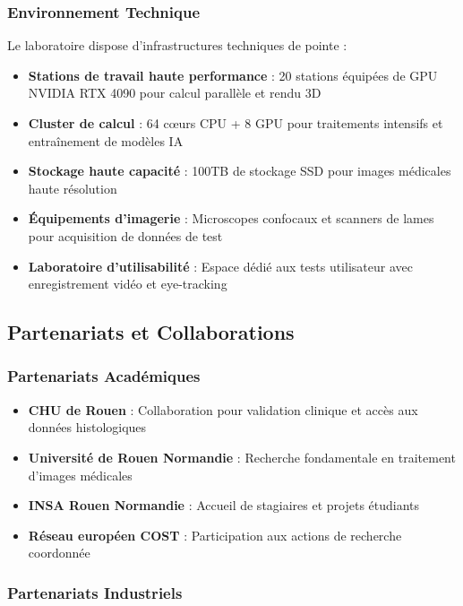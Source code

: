 \documentclass[12pt,a4paper]{report}
\begin{document}
\subsubsection{Environnement Technique}

Le laboratoire dispose d'infrastructures techniques de pointe :

\begin{itemize}
\item \textbf{Stations de travail haute performance} : 20 stations équipées de GPU NVIDIA RTX 4090 pour calcul parallèle et rendu 3D
\item \textbf{Cluster de calcul} : 64 cœurs CPU + 8 GPU pour traitements intensifs et entraînement de modèles IA
\item \textbf{Stockage haute capacité} : 100TB de stockage SSD pour images médicales haute résolution
\item \textbf{Équipements d'imagerie} : Microscopes confocaux et scanners de lames pour acquisition de données de test
\item \textbf{Laboratoire d'utilisabilité} : Espace dédié aux tests utilisateur avec enregistrement vidéo et eye-tracking
\end{itemize}

\subsection{Partenariats et Collaborations}

\subsubsection{Partenariats Académiques}

\begin{itemize}
\item \textbf{CHU de Rouen} : Collaboration pour validation clinique et accès aux données histologiques
\item \textbf{Université de Rouen Normandie} : Recherche fondamentale en traitement d'images médicales
\item \textbf{INSA Rouen Normandie} : Accueil de stagiaires et projets étudiants
\item \textbf{Réseau européen COST} : Participation aux actions de recherche coordonnée
\end{itemize}

\subsubsection{Partenariats Industriels}
\end{document}
